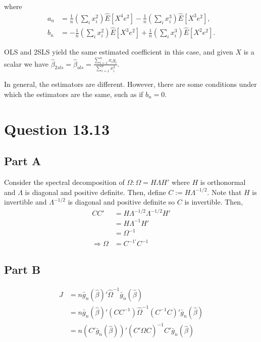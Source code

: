 \documentclass[11pt]{article} %
\begin{document}
where
\begin{align*}
a_n &= \frac{1}{n}\left( \sum_i x_i^2 \right) \hat{E}[X^4e^2] - \frac{1}{n}\left( \sum_i x_i^3 \right) \hat{E}[X^3e^2], \\
b_n &= -\frac{1}{n}\left( \sum_i x_i^2 \right) \hat{E}[X^3e^2] + \frac{1}{n}\left( \sum_i x_i^3 \right) \hat{E}[X^2e^2].
\end{align*}

OLS and 2SLS yield the same estimated coefficient in this case, and given $X$ is a scalar we have $\hat{\beta}_{2sls} =\hat{\beta}_{ols} = \frac{\sum_{i=1}^n x_iy_i}{\sum_{i=1}^n x_i^2}.$

In general, the estimators are different. However, there are some conditions under which the estimators are the same, such as if $b_n = 0.$

\section{Question 13.13}
\subsection{Part A}
Consider the spectral decomposition of $\Omega: \Omega = H\Lambda H'$ where $H$ is orthonormal and $\Lambda$ is diagonal and positive definite. Then, define $C:= H \Lambda^{-1/2}$. Note that $H$ is invertible and $\Lambda^{-1/2}$ is diagonal and positive definite so $C$ is invertible. Then,
\begin{align*}
CC' &= H \Lambda^{-1/2} \Lambda^{-1/2}H'\\
&= H \Lambda^{-1}H'\\
&= \Omega^{-1}\\
\Rightarrow \Omega &= C^{-1'}C^{-1}
\end{align*}
\subsection{Part B}
\begin{align*}
J &= n\bar{g}_n(\hat{\beta})'\hat{\Omega}^{-1}\bar{g}_n(\hat{\beta}) \\
&= n\bar{g}_n(\hat{\beta})'(CC^{-1})\hat{\Omega}^{-1}(C^{-1}C)'\bar{g}_n(\hat{\beta}) \\
&= n(C'\bar{g}_n(\hat{\beta}))'(C'\hat{\Omega}C)^{-1}C'\bar{g}_n(\hat{\beta}) \\
\end{align*}
\end{document}
